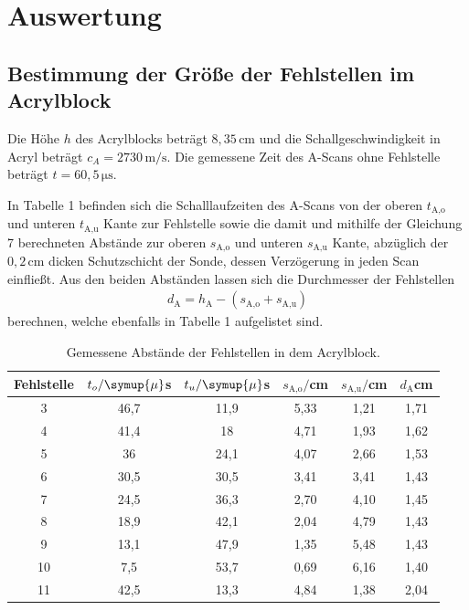 \section{Auswertung}
\label{sec:Auswertung}

\subsection{Bestimmung der Größe der Fehlstellen im Acrylblock}

Die Höhe $h$ des Acrylblocks beträgt $8,35\,\si{\centi\meter}$ 
und die Schallgeschwindigkeit in Acryl beträgt $c_A=2730\,\si{\meter\per\second}$\cite{kent2}.
Die gemessene Zeit des A-Scans ohne Fehlstelle beträgt $t=60,5\,\si{\micro\second}$.

In Tabelle 1 befinden sich die Schalllaufzeiten des A-Scans von der oberen $t_\text{A,o}$ 
und unteren $t_\text{A,u}$ Kante zur Fehlstelle sowie 
die damit und mithilfe der Gleichung 7 berechneten Abstände zur oberen $s_\text{A,o}$ und unteren
$s_\text{A,u}$ Kante, abzüglich der $0,2\,\si{\centi\meter}$ dicken Schutzschicht der Sonde, dessen
Verzögerung in jeden Scan einfließt. Aus den beiden Abständen 
lassen sich die Durchmesser der Fehlstellen 
\begin{align}
d_\text{A} = h_\text{A} - (s_\text{A,o} + s_\text{A,u})
\end{align}
berechnen, welche ebenfalls in Tabelle 1 aufgelistet sind.

\begin{table}[H]
  \centering
  \caption{Gemessene Abstände der Fehlstellen in dem Acrylblock.}
  \begin{tabular}{c c c c c c}
    \toprule
  Fehlstelle & $t_o/\symup{\mu}$s & $t_u/\symup{\mu}$s & $s_\text{A,o}/$cm & $s_\text{A,u}/$cm & $d_\text{A}$cm\\
    \midrule
    3  & 46,7 &  11,9  & 5,33 & 1,21  & 1,71  \\
    4  & 41,4 &  18    & 4,71 & 1,93  & 1,62  \\
    5  & 36   &  24,1  & 4,07 & 2,66  & 1,53  \\
    6  & 30,5 &  30,5  & 3,41 & 3,41  & 1,43  \\
    7  & 24,5 &  36,3  & 2,70 & 4,10  & 1,45  \\
    8  & 18,9 &  42,1  & 2,04 & 4,79  & 1,43  \\
    9  & 13,1 &  47,9  & 1,35 & 5,48  & 1,43  \\
    10 & 7,5  &  53,7  & 0,69 & 6,16  & 1,40  \\
    11 & 42,5 &  13,3  & 4,84 & 1,38  & 2,04  \\
    \bottomrule
  \end{tabular}
\end{table}

